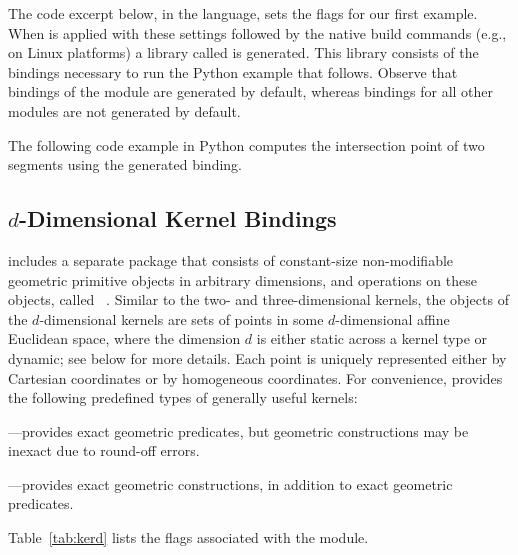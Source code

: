 The code excerpt below, in the \cmake{} language, sets the \cmake{} flags for our first example. When  is applied with these settings followed by the native build commands (e.g.,  on Linux platforms) a library called  is generated. This library consists of the bindings necessary to run the Python example that follows. Observe
that bindings of the \iiDandiiiDGeometryKernelPackage{} module are generated by default, whereas bindings for all other modules are not generated by default.

The following code example in Python computes the intersection point of two segments using the generated binding.

\subsection{$d$-Dimensional Kernel Bindings}
\label{ssec:modules:kerneld}
\cgal{} includes a separate package that consists of constant-size non-modifiable geometric primitive objects in arbitrary dimensions, and operations on these objects, called
\dDGeometryKernelPackage{}~\cite{cgal:s-gkd-21a}. Similar to the two- and three-dimensional kernels, the objects of the $d$-dimensional kernels are sets of points in some $d$-dimensional affine Euclidean space, where the dimension $d$ is either static across a kernel type
or dynamic; see below for more details. Each point is uniquely represented either by Cartesian coordinates or by homogeneous coordinates. For convenience, \cgal{} provides the following predefined types of generally useful kernels:
\begin{compactenum}
\item {}---provides exact geometric
  predicates, but geometric constructions may be inexact due to
  round-off errors.
\item {}---provides exact geometric
  constructions, in addition to exact geometric predicates.
\end{compactenum}
Table~\ref{tab:kerd} lists the \cmake{} flags associated with the
\dDGeometryKernelPackage{} module.

